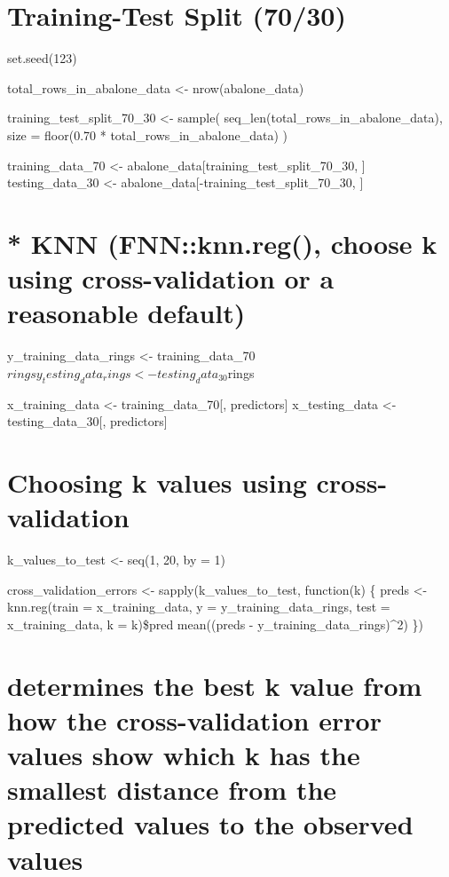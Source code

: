 \documentclass[
  letterpaper,
  DIV=11,
  numbers=noendperiod]{scrreprt}
\begin{document}
{

\chapter{Training-Test Split (70/30)}\label{training-test-split-7030}

set.seed(123)

total\_rows\_in\_abalone\_data \textless- nrow(abalone\_data)

training\_test\_split\_70\_30 \textless- sample(
seq\_len(total\_rows\_in\_abalone\_data), size = floor(0.70 *
total\_rows\_in\_abalone\_data) )

training\_data\_70 \textless-
abalone\_data{[}training\_test\_split\_70\_30, {]} testing\_data\_30
\textless- abalone\_data{[}-training\_test\_split\_70\_30, {]}


\chapter{* KNN (FNN::knn.reg(), choose k using cross-validation or a
reasonable
default)}\label{knn-fnnknn.reg-choose-k-using-cross-validation-or-a-reasonable-default}

y\_training\_data\_rings \textless- training\_data\_70\(rings
y_testing_data_rings  <- testing_data_30\)rings

x\_training\_data \textless- training\_data\_70{[}, predictors{]}
x\_testing\_data \textless- testing\_data\_30{[}, predictors{]}


\chapter{Choosing k values using
cross-validation}\label{choosing-k-values-using-cross-validation}

k\_values\_to\_test \textless- seq(1, 20, by = 1)

cross\_validation\_errors \textless- sapply(k\_values\_to\_test,
function(k) \{ preds \textless- knn.reg(train = x\_training\_data, y =
y\_training\_data\_rings, test = x\_training\_data, k = k)\$pred
mean((preds - y\_training\_data\_rings)\^{}2) \})


\chapter{determines the best k value from how the cross-validation error
values show which k has the smallest distance from the predicted values
to the observed
values}\label{determines-the-best-k-value-from-how-the-cross-validation-error-values-show-which-k-has-the-smallest-distance-from-the-predicted-values-to-the-observed-values}

}
\end{document}
